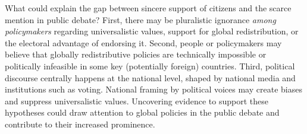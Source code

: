 \documentclass{nature}
\begin{document}
What could explain the gap between sincere support of citizens and the scarce mention in public debate? First, there may be pluralistic ignorance \textit{among policymakers} regarding universalistic values, support for global redistribution, or the electoral advantage of endorsing it. Second, people or policymakers may believe that globally redistributive policies are technically impossible or politically infeasible in some key (potentially foreign) countries. %
Third, political discourse centrally happens at the national level, shaped by national media and institutions such as voting. 
National framing by political voices may create biases and suppress universalistic values. Uncovering evidence to support these hypotheses could %
draw attention to global policies in the public debate and contribute to their increased prominence.%
\end{document}
